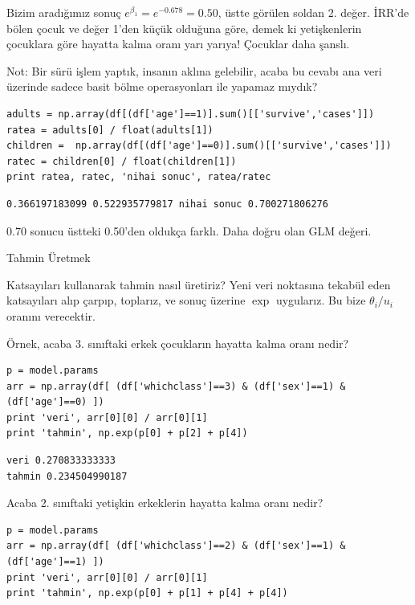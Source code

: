 \documentclass[12pt,fleqn]{article}\usepackage{../../common}
\begin{document}
Bizim aradığımız sonuç $e^{\beta_1} = e^{-0.678} = 0.50$, üstte görülen
soldan 2. değer. İRR'de bölen çocuk ve değer 1'den küçük olduğuna göre,
demek ki yetişkenlerin çocuklara göre hayatta kalma oranı yarı yarıya!
Çocuklar daha şanslı.

Not: Bir sürü işlem yaptık, insanın aklına gelebilir, acaba bu cevabı ana
veri üzerinde sadece basit bölme operasyonları ile yapamaz mıydık?

\begin{verbatim}
adults = np.array(df[(df['age']==1)].sum()[['survive','cases']])
ratea = adults[0] / float(adults[1])
children =  np.array(df[(df['age']==0)].sum()[['survive','cases']])
ratec = children[0] / float(children[1])
print ratea, ratec, 'nihai sonuc', ratea/ratec
\end{verbatim}

\begin{verbatim}
0.366197183099 0.522935779817 nihai sonuc 0.700271806276
\end{verbatim}

0.70 sonucu üstteki 0.50'den oldukça farklı. Daha doğru olan GLM değeri.

Tahmin Üretmek 

Katsayıları kullanarak tahmin nasıl üretiriz? Yeni veri noktasına tekabül
eden katsayıları alıp çarpıp, toplarız, ve sonuç üzerine $\exp$
uygularız. Bu bize $\theta_i/u_i$ oranını verecektir. 

Örnek, acaba 3. sınıftaki erkek çocukların hayatta kalma oranı nedir?

\begin{verbatim}
p = model.params
arr = np.array(df[ (df['whichclass']==3) & (df['sex']==1) & (df['age']==0) ])
print 'veri', arr[0][0] / arr[0][1]
print 'tahmin', np.exp(p[0] + p[2] + p[4])
\end{verbatim}

\begin{verbatim}
veri 0.270833333333
tahmin 0.234504990187
\end{verbatim}

Acaba 2. sınıftaki yetişkin erkeklerin hayatta kalma oranı nedir? 

\begin{verbatim}
p = model.params
arr = np.array(df[ (df['whichclass']==2) & (df['sex']==1) & (df['age']==1) ])
print 'veri', arr[0][0] / arr[0][1]
print 'tahmin', np.exp(p[0] + p[1] + p[4] + p[4])
\end{verbatim}
\end{document}
